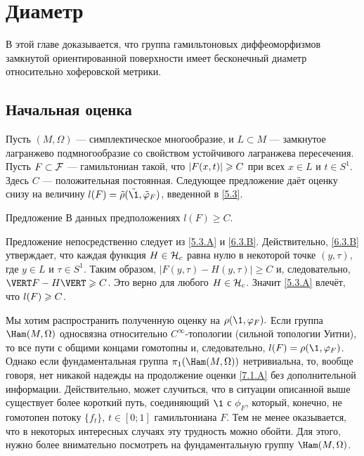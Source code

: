 \chapter{Диаметр}

В этой главе доказывается, что группа гамильтоновых диффеоморфизмов
замкнутой ориентированной поверхности имеет бесконечный диаметр
относительно хоферовской метрики. 

\section{Начальная оценка}
Пусть $(M, \Omega)$ — симплектическое многообразие, и $L \subset M$
— замкнутое лагранжево подмногообразие со свойством  устойчивого
лагранжева пересечения. 
Пусть $F \subset \mathcal{F}$ — гамильтониан такой, что $| F (x, t) | \z\ge C$ при всех $x \in L$ и $t \in S^1$.
Здесь $C$ — положительная постоянная.
Следующее предложение даёт оценку снизу на величину $l (F) \z= \tilde\rho (\tilde\1, \tilde\phi_F)$, введенной в \ref{5.3}.

\begin{thm}{Предложение}\label{7.1.A}
В данных предположениях $l (F) \ge C$.
\end{thm}

Предложение непосредственно следует из \ref{5.3.A} и \ref{6.3.B}.
Действительно, \ref{6.3.B} утверждает, что каждая функция $H \z\in \H_c$ равна нулю в некоторой точке $(y, \tau)$, где $y \in L$ и $\tau \in S^1$.
Таким образом, $| F (y, \tau) - H (y, \tau) | \ge C$ и, следовательно, $\VERT F - H \VERT \z\ge C$.
Это верно для любого $H \in \mathcal{H}_c$.
Значит \ref{5.3.A} влечёт, что $l (F) \z\ge C$.
\qeds

Мы хотим распространить полученную оценку на $\rho (\1, \phi_F).$
Если группа $\Ham (M, \Omega)$ односвязна относительно $C^\infty$-топологии (сильной топологии Уитни), то все пути с общими концами гомотопны и, следовательно, $l (F) = \rho (\1, \phi_F)$.
Однако если фундаментальная группа $\pi_1 (\Ham (M, \Omega))$ нетривиальна, то, вообще говоря, нет никакой надежды на продолжение оценки \ref{7.1.A} без дополнительной информации.
Действительно, может случиться, что в ситуации описанной выше существует более короткий путь, соединяющий $\1$ с $\phi_F$, который, конечно, не гомотопен потоку $\{f_t\}$, $t \in [0; 1]$ гамильтониана $F$.
Тем не менее оказывается, что в некоторых интересных случаях эту трудность можно обойти.
Для этого, нужно более внимательно посмотреть на фундаментальную группу $\Ham (M, \Omega)$.

